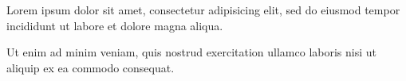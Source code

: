 \begin{minipage}{0.51\textwidth}
    Lorem ipsum dolor sit amet, consectetur adipisicing elit, sed do eiusmod
    tempor incididunt ut labore et dolore magna aliqua. 

    Ut enim ad minim veniam,
    quis nostrud exercitation ullamco laboris nisi ut aliquip ex ea commodo
    consequat.
\end{minipage}
\hfill
\begin{minipage}{0.45\textwidth}
    \begin{center}
    \end{center}
\end{minipage}

